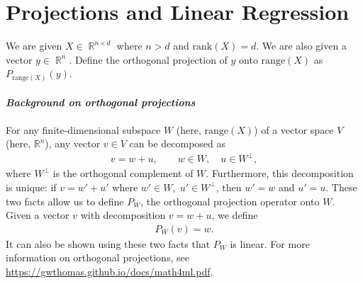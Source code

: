 \documentclass{article}
\newcommand{\Question}[1]{\Large \section{ #1 } \normalsize}
\DeclareMathOperator{\R}{\mathbb{R}}
\begin{document}
\newpage
\Question{Projections and Linear Regression}

We are given $X \in \R^{n \times d}$ where $n > d$ and $\mathrm{rank}(X) = d$. We are also given a vector $y \in \R^n$. Define the orthogonal projection of $y$ onto $\mathrm{range}(X)$ as $P_{\text{range}(X)}(y)$. 

\paragraph{\textit{Background on orthogonal projections}} For any finite-dimensional subspace $W$ (here, $\mathrm{range}(X)$) of a vector space $V$ (here, $\mathbb R^n$), any vector $v\in V$ can be decomposed as 
\begin{align*}
    v = w + u,\qquad w\in W,\quad u \in W^\perp, 
\end{align*}
where $W^\perp$ is the orthogonal complement of $W$. Furthermore, this decomposition is unique: if $v=w'+u'$ where $w'\in W,\; u'\in W^\perp$, then $w'=w$ and $u'=u$. These two facts allow us to define $P_W$, the orthogonal projection operator onto $W$. Given a vector $v$ with decomposition $v=w+u$, we define
\begin{align*}
    P_W(v) = w.
\end{align*}
It can also be shown using these two facts that $P_W$ is linear. For more information on orthogonal projections, see \url{https://gwthomas.github.io/docs/math4ml.pdf}.
\end{document}
